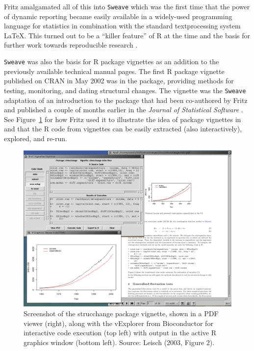 Fritz amalgamated all of this into \texttt{Sweave} which was the first time that the
power of dynamic reporting became easily available in a widely-used programming
language for statistics in combination with the standard textprocessing system
LaTeX. This turned out to be a ``killer feature'' of R at the time and the basis
for further work towards reproducible research \citep{Hothorn+Leisch_2011, Stodden:2014}.

\texttt{Sweave} was also the basis for R package vignettes \citep{Leisch:2003} as an
addition to the previously available technical manual pages.
The first R package vignette published on CRAN in May 2002 was in the
 package, providing methods for testing, monitoring,
and dating structural changes. The vignette was the \texttt{Sweave} adaptation
of an introduction to the package that had been co-authored by Fritz and
published a couple of months earlier in the \emph{Journal of Statistical Software}
\citep{Zeileis+Leisch+Hornik:2002}. See Figure~\ref{fig:sweave} for how
Fritz used it to illustrate the idea of package vignettes in \citet{Leisch:2003}
and that the R code from vignettes can be easily extracted (also interactively),
explored, and re-run.

\begin{figure}[t!]

{\centering \includegraphics[width=1\linewidth]{figures/img-sweave} 

}

\caption{Screenshot of the strucchange package vignette, shown in a PDF viewer (right), along with the vExplorer from Bioconductor for interactive code execution (top left) with output in the active R graphics window (bottom left). Source: Leisch (2003, Figure 2).}\label{fig:sweave}
\end{figure}

